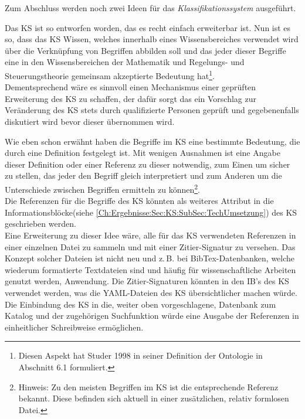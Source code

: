 Zum Abschluss werden noch zwei Ideen für das \textit{Klassifikationssystem} ausgeführt.

Das KS ist so entworfen worden, das es recht einfach erweiterbar ist. Nun ist es so, dass das KS Wissen, welches innerhalb eines Wissensbereiches verwendet wird über die Verknüpfung von Begriffen abbilden soll und das jeder dieser Begriffe eine in den Wissensbereichen der Mathematik und Regelungs- und Steuerungstheorie gemeinsam akzeptierte Bedeutung hat\footnote{Diesen Aspekt hat Studer 1998 in seiner Definition der Ontologie in \cite{STBEFE98} Abschnitt 6.1 formuliert.}.\\
Dementsprechend wäre es sinnvoll einen Mechanismus einer geprüften Erweiterung des KS zu schaffen, der dafür sorgt das ein Vorschlag zur Veränderung des KS stets durch qualifizierte Personen geprüft und gegebenenfalls diskutiert wird bevor dieser übernommen wird.

Wie eben schon erwähnt haben die Begriffe im KS eine bestimmte Bedeutung, die durch eine Definition festgelegt ist. Mit wenigen Ausnahmen ist eine Angabe dieser Definition oder einer Referenz zu dieser notwendig, zum Einen um sicher zu stellen, das jeder den Begriff gleich interpretiert und zum Anderen um die Unterschiede zwischen Begriffen ermitteln zu können\footnote{Hinweis: Zu den meisten Begriffen im KS ist die entsprechende Referenz bekannt. Diese befinden sich aktuell in einer zusätzlichen, relativ formlosen Datei.}.\\
Die Referenzen für die Begriffe des KS könnten als weiteres Attribut in die Informationsblöcke(siehe \autoref{Ch:Ergebnisse:Sec:KS:SubSec:TechUmsetzung}) des KS geschrieben werden.\\
Eine Erweiterung zu dieser Idee wäre, alle für das KS verwendeten Referenzen in einer einzelnen Datei zu sammeln und mit einer Zitier-Signatur zu versehen. Das Konzept solcher Dateien ist nicht neu und z.\,B. bei BibTex-Datenbanken, welche wiederum formatierte Textdateien sind und häufig für wissenschaftliche Arbeiten genutzt werden, Anwendung. Die Zitier-Signaturen könnten in den IB's des KS verwendet werden, was die YAML-Dateien des KS übersichtlicher machen würde. \\
Die Einbindung des KS in die, weiter oben vorgeschlagene, Datenbank zum Katalog und der zugehörigen Suchfunktion würde eine Ausgabe der Referenzen in einheitlicher Schreibweise ermöglichen.



